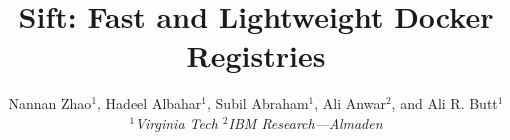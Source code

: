 \documentclass[10pt,twocolumn]{article}
\newcommand{\sysname}{Sift\xspace}
\begin{document}
\title{
\sysname: Fast and Lightweight Docker Registries
}


\author{
	{\rm Nannan Zhao$^{1}$,
		Hadeel Albahar$^{1}$,
		Subil Abraham$^{1}$,
		Ali Anwar$^{2}$},
	and Ali R. Butt$^{1}$\\
	\small {\em $^1$Virginia Tech \quad $^{2}$IBM Research---Almaden} \\ [2mm]
}

\date{}
\maketitle





% 











{
}
\end{document}
